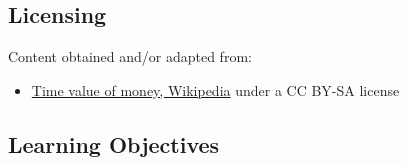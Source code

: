 \subsection{Licensing}
\label{sss:lice-7352}




Content obtained and/or adapted from:



\begin{itemize}
    \item \href{https://en.wikipedia.org/wiki/Time_value_of_money}{Time value of money, Wikipedia} under a CC BY-SA license
\end{itemize}


\subsection{Learning Objectives}
\label{ssec:lear-fe6e}


